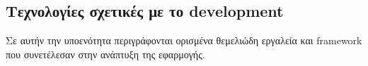 \subsection{Τεχνολογίες σχετικές με το development}

Σε αυτήν την υποενότητα περιγράφονται ορισμένα θεμελιώδη εργαλεία και framework που συνετέλεσαν στην ανάπτυξη της εφαρμογής.





